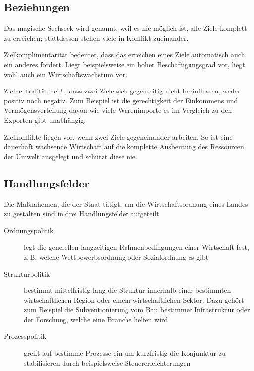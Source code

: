 \documentclass{article}
\begin{document}
\subsection{Beziehungen} 
\begin{multicols}{1} 
\noindent Das magische Sechseck wird  genannt, weil es nie möglich ist, alle Ziele komplett zu erreichen; stattdessen stehen viele in Konflikt zueinander.
\begin{description*}
 \item[Zielkomplimentarität] bedeutet, dass das erreichen eines Ziele automatisch auch ein anderes fördert. Liegt beispielsweise ein hoher Beschäftigungsgrad vor, liegt wohl auch ein Wirtschaftswachstum vor.
 \item[Zielneutralität] heißt, dass zwei Ziele sich gegenseitig nicht beeinflussen, weder positiv noch negativ. Zum Beispiel ist die gerechtigkeit der Einkommens und Vermögensverteilung davon wie viele Warenimporte es im Vergleich zu den Exporten gibt unabhängig.
 \item[Zielkonflikte] liegen vor, wenn zwei Ziele gegeneinander arbeiten. So ist eine dauerhaft wachsende Wirtschaft auf die komplette Ausbeutung des Ressourcen der Umwelt ausgelegt und schützt diese nie.
\end{description*} 
\end{multicols} 
 
\subsection{Handlungsfelder}
Die Maßnahemen, die der Staat tätigt, um die Wirtschaftsordnung eines Landes zu gestalten sind in drei Handlungsfelder aufgeteilt 
\begin{description}
 \item[Ordnungspolitik] legt die generellen langzeitigen Rahmenbedingungen einer Wirtschaft fest, z.\,B. welche Wettbewerbsordnung oder Sozialordnung es gibt
 \item[Strukturpolitik] bestimmt mittelfristig lang die Struktur innerhalb einer bestimmten wirtschaftlichen Region oder einem wirtschaftlichen Sektor. Dazu gehört zum Beispiel die Subventionierung vom Bau bestimmer Infrastruktur oder der Forschung, welche eine Branche helfen wird 
 \item[Prozesspolitik] greift auf bestimme Prozesse ein um kurzfristig die Konjunktur zu stabilisieren durch beispielsweise Steuererleichterungen
\end{description} 
\end{document}
